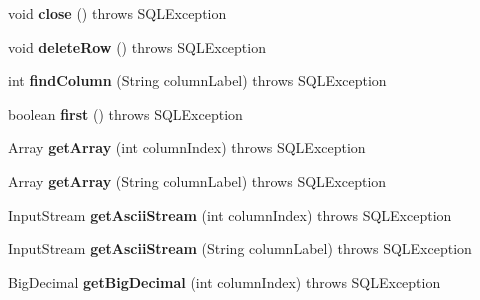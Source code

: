 \begin{DoxyCompactItemize}
void {\bfseries close} ()  throws S\+Q\+L\+Exception 
\item 
\mbox{\label{classsimpledb_1_1jdbc_1_1ResultSetAdapter_a9c4a7d7af5a96771dd400208bb1e581d}} 
void {\bfseries delete\+Row} ()  throws S\+Q\+L\+Exception 
\item 
\mbox{\label{classsimpledb_1_1jdbc_1_1ResultSetAdapter_a999aab43778b9aafc79449cbb7c2e967}} 
int {\bfseries find\+Column} (String column\+Label)  throws S\+Q\+L\+Exception 
\item 
\mbox{\label{classsimpledb_1_1jdbc_1_1ResultSetAdapter_aa752bed5a3145624583a3a640fbb0c18}} 
boolean {\bfseries first} ()  throws S\+Q\+L\+Exception 
\item 
\mbox{\label{classsimpledb_1_1jdbc_1_1ResultSetAdapter_a7d38885c83a1f1ca9458da5dee622537}} 
Array {\bfseries get\+Array} (int column\+Index)  throws S\+Q\+L\+Exception 
\item 
\mbox{\label{classsimpledb_1_1jdbc_1_1ResultSetAdapter_a2f3e2c41e327924f555478850340189e}} 
Array {\bfseries get\+Array} (String column\+Label)  throws S\+Q\+L\+Exception 
\item 
\mbox{\label{classsimpledb_1_1jdbc_1_1ResultSetAdapter_a5c80c819293af4bdd098d8dd92b6ebb0}} 
Input\+Stream {\bfseries get\+Ascii\+Stream} (int column\+Index)  throws S\+Q\+L\+Exception 
\item 
\mbox{\label{classsimpledb_1_1jdbc_1_1ResultSetAdapter_a9b328ced9fed11f19d5eb22a7231712e}} 
Input\+Stream {\bfseries get\+Ascii\+Stream} (String column\+Label)  throws S\+Q\+L\+Exception 
\item 
\mbox{\label{classsimpledb_1_1jdbc_1_1ResultSetAdapter_ae3b888f56867224dc59293a2404eb2b0}} 
Big\+Decimal {\bfseries get\+Big\+Decimal} (int column\+Index)  throws S\+Q\+L\+Exception 
\item 
\mbox{\label{classsimpledb_1_1jdbc_1_1ResultSetAdapter_a3ed11c188b9cae989a44b65cf2d99b21}} 

\end{DoxyCompactItemize}
